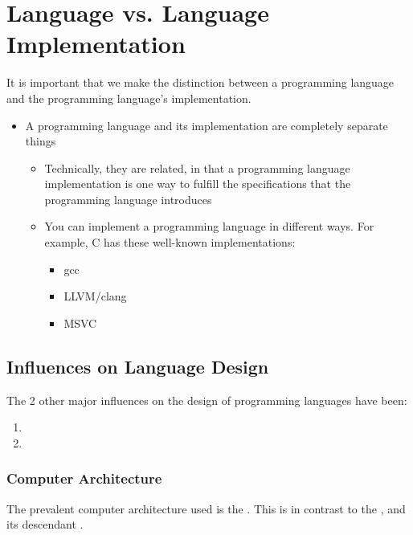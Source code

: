 \section{Language vs. Language Implementation}\label{sec:Lang_vs_Lang_Implementation}
It is important that we make the distinction between a programming language and the programming language's implementation.

\begin{itemize}[noitemsep]
\item A programming language and its implementation are completely separate things
  \begin{itemize}[noitemsep]
  \item Technically, they are related, in that a programming language implementation is one way to fulfill the specifications that the programming language introduces
  \item You can implement a programming language in different ways. For example, C has these well-known implementations:
    \begin{itemize}[noitemsep]
    \item gcc
    \item LLVM/clang
    \item MSVC
    \end{itemize}
  \end{itemize}
\end{itemize}

\subsection{Influences on Language Design}\label{subsec:Influences_Language_Design}
The 2 other major influences on the design of programming languages have been:
\begin{enumerate}[noitemsep]
\item {}
\item {}
\end{enumerate}

\subsubsection{Computer Architecture}\label{subsubsec:Computer_Architecture}
The prevalent computer architecture used is the .
This is in contrast to the , and its descendant .

